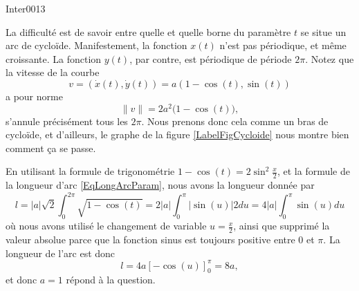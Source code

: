 \begin{corrige}{Inter0013}

La difficulté est de savoir entre quelle et quelle borne du paramètre $t$ se situe un \og arc\fg{} de cycloïde. Manifestement, la fonction $x(t)$ n'est pas périodique, et même croissante. La fonction $y(t)$, par contre, est périodique de période $2\pi$. Notez que la vitesse de la courbe
\begin{equation}
	v=( \dot x(t),\dot y(t) )=a(1-\cos(t),\sin(t))
\end{equation}
a pour norme
\begin{equation}
	\| v \|=2a^2\big( 1-\cos(t) \big),
\end{equation}
s'annule précisément tous les $2\pi$. Nous prenons donc cela comme un bras de cycloïde, et d'ailleurs, le graphe de la figure \ref{LabelFigCycloide} nous montre bien comment ça se passe.

\newcommand{\CaptionFigCycloide}{La cycloïde.}


En utilisant la formule de trigonométrie $1-\cos(t)=2\sin^2\frac{ x }{ 2 }$, et la formule de la longueur d'arc \eqref{EqLongArcParam}, nous avons la longueur donnée par
\begin{equation}
	l=| a |\sqrt{2}\int_0^{2\pi}\sqrt{1-\cos(t)}=2| a |\int_0^{\pi}|\sin(u)|2 du=4| a |\int_0^{\pi}\sin(u) du
\end{equation}
où nous avons utilisé le changement de variable $u=\frac{ x }{ 2 }$, ainsi que supprimé la valeur absolue parce que la fonction sinus est toujours positive entre $0$ et $\pi$. La longueur de l'arc est donc
\begin{equation}
	l=4a\left[ -\cos(u) \right]_0^{\pi}=8a,
\end{equation}
et donc $a=1$ répond à la question.

\end{corrige}
